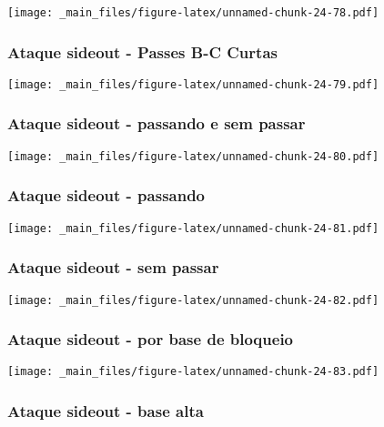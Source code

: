 \documentclass[
]{book}
\begin{document}
\texttt{[image: \_main\_files/figure-latex/unnamed-chunk-24-78.pdf]}

\subsubsection*{Ataque sideout - Passes B-C Curtas}\label{ataque-sideout---passes-b-c-curtas-4}

\texttt{[image: \_main\_files/figure-latex/unnamed-chunk-24-79.pdf]}

\subsubsection*{Ataque sideout - passando e sem passar}\label{ataque-sideout---passando-e-sem-passar-4}

\texttt{[image: \_main\_files/figure-latex/unnamed-chunk-24-80.pdf]}

\subsubsection*{Ataque sideout - passando}\label{ataque-sideout---passando-4}

\texttt{[image: \_main\_files/figure-latex/unnamed-chunk-24-81.pdf]}

\subsubsection*{Ataque sideout - sem passar}\label{ataque-sideout---sem-passar-4}

\texttt{[image: \_main\_files/figure-latex/unnamed-chunk-24-82.pdf]}

\subsubsection*{Ataque sideout - por base de bloqueio}\label{ataque-sideout---por-base-de-bloqueio-4}

\texttt{[image: \_main\_files/figure-latex/unnamed-chunk-24-83.pdf]}

\subsubsection*{Ataque sideout - base alta}\label{ataque-sideout---base-alta-4}
\end{document}
